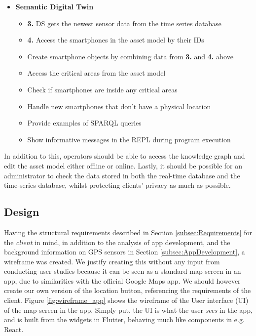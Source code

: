 \documentclass{article}
\begin{document}
\begin{itemize}
    \item \textbf{Semantic Digital Twin}
    \begin{itemize} 
        \item \textbf{3.} DS gets the newest sensor data from the time series database
        \item \textbf{4.} Access the smartphones in the asset model by their IDs
        \item Create smartphone objects by combining data from \textbf{3.} and \textbf{4.} above 
        \item Access the critical areas from the asset model
        \item Check if smartphones are inside any critical areas
        \item Handle new smartphones that don’t have a physical location
        \item Provide examples of SPARQL queries
        \item Show informative messages in the REPL during program execution
    \end{itemize}
\end{itemize}

In addition to this, operators should be able to access the knowledge graph and edit the asset model either offline or online. Lastly, it should be possible for an administrator to check the data stored in both the real-time database and the time-series database, whilst protecting clients' privacy as much as possible.

\subsection{Design}\label{subsec:Design}
Having the structural requirements described in Section \ref{subsec:Requirements} for the \emph{client} in mind, in addition to the analysis of app development, and the background information on GPS sensors in Section \ref{subsec:AppDevelopment}, a wireframe was created. We justify creating this without any input from conducting user studies because it can be seen as a standard map screen in an app, due to similarities with the official Google Maps app. We should however create our own version of the location button, referencing the requirements of the client. Figure \ref{fig:wireframe_app} shows the wireframe of the User interface (UI) of the map screen in the app. Simply put, the UI is what the user \emph{sees} in the app, and is built from the widgets in Flutter, behaving much like components in e.g. React.
\end{document}
